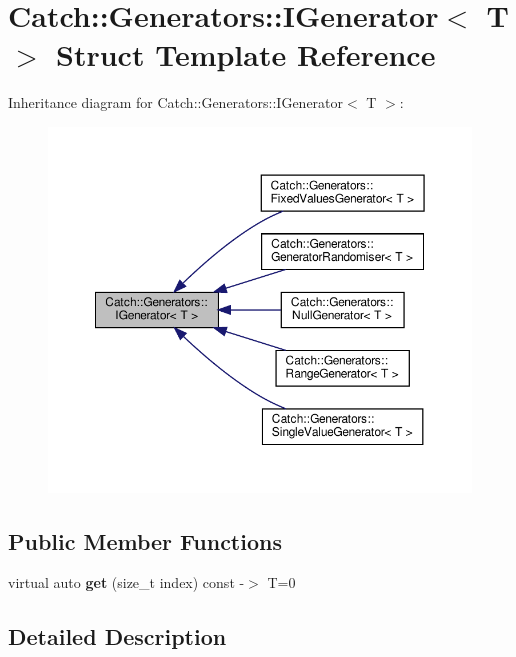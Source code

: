 \hypertarget{structCatch_1_1Generators_1_1IGenerator}{}\section{Catch\+::Generators\+::I\+Generator$<$ T $>$ Struct Template Reference}
\label{structCatch_1_1Generators_1_1IGenerator}


Inheritance diagram for Catch\+::Generators\+::I\+Generator$<$ T $>$\+:
\nopagebreak
\begin{figure}[H]
\begin{center}
\leavevmode
\includegraphics[width=350pt]{structCatch_1_1Generators_1_1IGenerator__inherit__graph}
\end{center}
\end{figure}
\subsection*{Public Member Functions}
\begin{DoxyCompactItemize}
\item 
\mbox{\label{structCatch_1_1Generators_1_1IGenerator_a737a89eb0bff02e580e36c59fb0d1171}} 
virtual auto {\bfseries get} (size\+\_\+t index) const -\/$>$ T=0
\end{DoxyCompactItemize}


\subsection{Detailed Description}
